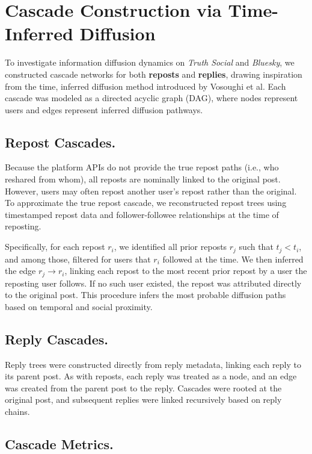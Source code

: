 \documentclass[letterpaper]{article} %
\begin{document}
\appendix
\label{method}
\section*{Cascade Construction via Time-Inferred Diffusion}

To investigate information diffusion dynamics on \textit{Truth Social} and \textit{Bluesky}, we constructed cascade networks for both \textbf{reposts} and \textbf{replies}, drawing inspiration from the time, inferred diffusion method introduced by Vosoughi et al\cite{vosoughi_spread_2018}. Each cascade was modeled as a directed acyclic graph (DAG), where nodes represent users and edges represent inferred diffusion pathways.

\subsection{Repost Cascades.}
Because the platform APIs do not provide the true repost paths (i.e., who reshared from whom), all reposts are nominally linked to the original post. However, users may often repost another user's repost rather than the original. To approximate the true repost cascade, we reconstructed repost trees using timestamped repost data and follower-followee relationships at the time of reposting.

Specifically, for each repost \( r_i \), we identified all prior reposts \( r_j \) such that \( t_j < t_i \), and among those, filtered for users that \( r_i \) followed at the time. We then inferred the edge \( r_j \rightarrow r_i \), linking each repost to the most recent prior repost by a user the reposting user follows. If no such user existed, the repost was attributed directly to the original post. This procedure infers the most probable diffusion paths based on temporal and social proximity.

\subsection{Reply Cascades.}
Reply trees were constructed directly from reply metadata, linking each reply to its parent post. As with reposts, each reply was treated as a node, and an edge was created from the parent post to the reply. Cascades were rooted at the original post, and subsequent replies were linked recursively based on reply chains.


\subsection{Cascade Metrics.}
\end{document}
